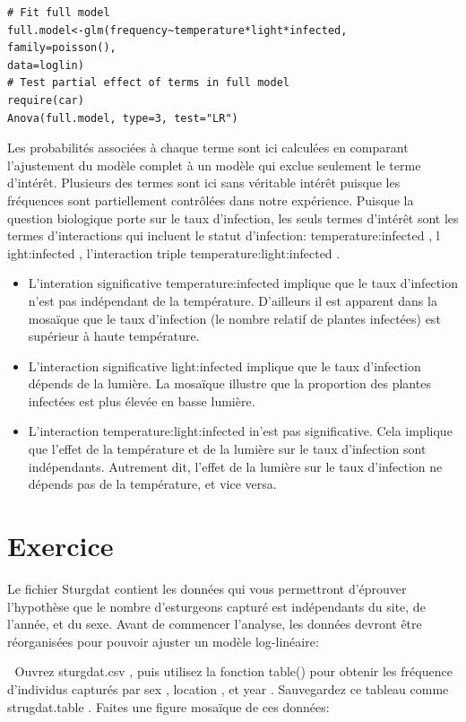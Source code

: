 \documentclass[12pt,]{book}
\providecommand{\tightlist}{%
  \setlength{\itemsep}{0pt}\setlength{\parskip}{0pt}}
\begin{document}
\begin{verbatim}
# Fit full model
full.model<-glm(frequency~temperature*light*infected, family=poisson(),
data=loglin)
# Test partial effect of terms in full model
require(car)
Anova(full.model, type=3, test="LR")
\end{verbatim}

Les probabilités associées à chaque terme sont ici calculées en
comparant l'ajustement du modèle complet à un modèle qui exclue
seulement le terme d'intérêt. Plusieurs des termes sont ici sans
véritable intérêt puisque les fréquences sont partiellement contrôlées
dans notre expérience. Puisque la question biologique porte sur le
taux d'infection, les seuls termes d'intérêt sont les termes
d'interactions qui incluent le statut d'infection:
temperature:infected , l ight:infected , l'interaction triple
temperature:light:infected .

\begin{itemize}
\tightlist
\item
  L'interation significative temperature:infected implique que le
  taux d'infection n'est pas indépendant de la température. D'ailleurs il est apparent dans la mosaïque que le taux d'infection (le
  nombre relatif de plantes infectées) est supérieur à haute température.
\item
  L'interaction significative light:infected implique que le taux
  d'infection dépends de la lumière. La mosaïque illustre que la proportion des plantes infectées est plus élevée en basse lumière.
\item
  L'interaction temperature:light:infected in'est pas significative. Cela implique que l'effet de la température et de la lumière sur
  le taux d'infection sont indépendants. Autrement dit, l'effet de la
  lumière sur le taux d'infection ne dépends pas de la température,
  et vice versa.
\end{itemize}

\hypertarget{ex-glm}{%
\section{Exercice}\label{ex-glm}}

Le fichier Sturgdat contient les données qui vous permettront
d'éprouver l'hypothèse que le nombre d'esturgeons capturé est
indépendants du site, de l'année, et du sexe. Avant de commencer
l'analyse, les données devront être réorganisées pour pouvoir ajuster
un modèle log-linéaire:

 Ouvrez sturgdat.csv , puis utilisez la fonction table() pour obtenir
les fréquence d'individus capturés par sex , location , et year . Sauvegardez ce tableau comme strugdat.table . Faites une figure mosaïque
de ces données:
\end{document}
